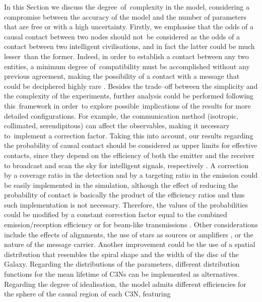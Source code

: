 \documentclass[crop]{CSLB}
\newcommand{\ceti}{C3N}
\newcommand{\cetis}{C3Ns}
\begin{document}
In this Section we discuss the degree of complexity in the model, considering a
compromise between the accuracy of the model and the number of parameters that
are free or with a high uncertainty.
%
Firstly, we emphasise that the odds of a causal contact between two nodes
should not be considered as the odds of a contact between two intelligent
civilisations, and in fact the latter could be much lesser than the former.
%
Indeed, in order to establish a contact between any two entities, a minimum
degree of compatibility must be accomplished without any previous agreement,
making the possibility of a contact with a message that could be deciphered
highly rare \citep[see e.g. ][]{forgan_collimated_2014}.
%
Besides the trade--off between the simplicity and the complexity of the
experiments, further analysis could be performed following this framework in
order to explore possible implications of the results for more detailed
configurations.
%
For example, the communication method (isotropic, collimated, serendipitous)
can affect the observables, making it necessary to implement a correction
factor.
%
Taking this into account, our results regarding the probability of causal
contact should be considered as upper limits for effective contacts, since they
depend on the efficiency of both the emitter and the receiver to broadcast and
scan the sky for intelligent signals, respectively
\citep{grimaldi_signal_2017}.
%
A correction by a coverage ratio in the detection and by a targeting ratio in the
emission could be easily implemented in the simulation, although the effect of
reducing the probability of contact is basically the product of the efficiency
ratios and thus such implementation is not necessary.
%
Therefore, the values of the probabilities could be modified by a constant
correction factor equal to the combined emission/reception efficiency
\citep{smith_broadcasting_2009, anchordoqui_upper_2019, forgan_collimated_2014}
or for beam-like transmissions \citep{grimaldi_signal_2017}. 
%
Other considerations include the effects of alignments, the use of stars as
sources or amplifiers \citep{Edmondson2003, borra_searching_2012}, or the
nature of the message carrier.
%
Another improvement could be the use of a spatial distribution that resembles
the spiral shape and the width of the disc of the Galaxy.
%
Regarding the distributions of the parameters, different distribution functions
for the mean lifetime of \cetis{} can be implemented as alternatives.
%
Regarding the degree of idealisation, the model admits different
efficiencies for the sphere of the causal region of each \ceti{}, featuring
\end{document}

